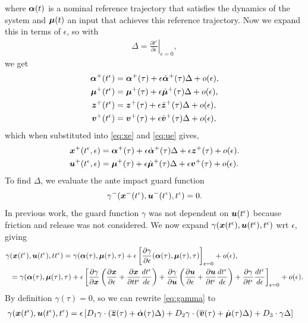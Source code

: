 \documentclass[../DC2017114Bouma.tex]{subfiles}
\begin{document}
where $\boldsymbol{\alpha}(t)$ is a nominal reference trajectory that satisfies the dynamics of the system and $\boldsymbol{\mu}(t)$ an input that achieves this reference trajectory. Now we expand this in terms of $\epsilon$, so with
\begin{align}
\Delta = \left.\frac{\partial t^\epsilon}{\partial\epsilon}\right|_{\epsilon=0},
\end{align} 
we get
\begin{align}
\boldsymbol{\alpha}^{+}(t^\epsilon) &= \boldsymbol{\alpha}^{+}(\tau) + \epsilon \dot{\boldsymbol{\alpha}}^{+}(\tau)\Delta + o(\epsilon),\\
\boldsymbol{\mu}^{+}(t^\epsilon) &= \boldsymbol{\mu}^{+}(\tau) + \epsilon \dot{\boldsymbol{\mu}}^{+}(\tau)\Delta + o(\epsilon),\\
{\boldsymbol{z}}^{+}(t^\epsilon) &= {\boldsymbol{z}}^{+}(\tau) + \epsilon \dot{{\boldsymbol{z}}}^{+}(\tau)\Delta + o(\epsilon),\\
{\boldsymbol{v}}^{+}(t^\epsilon) &= {\boldsymbol{v}}^{+}(\tau) + \epsilon \dot{{\boldsymbol{v}}}^{+}(\tau)\Delta + o(\epsilon),
\end{align}
which when substituted into \eqref{eq:xe} and \eqref{eq:ue} gives,
\begin{align}
{\boldsymbol{x}}^{+}(t^\epsilon,\epsilon) &= \boldsymbol{\alpha}^{+}(\tau) + \epsilon \dot{\boldsymbol{\alpha}}^{+}(\tau)\Delta + \epsilon {\boldsymbol{z}}^{+}(\tau) + o(\epsilon). \label{eq:xeexp}\\
{\boldsymbol{u}}^{+}(t^\epsilon,\epsilon) &= \boldsymbol{\mu}^{+}(\tau) + \epsilon \dot{\boldsymbol{\mu}}^{+}(\tau)\Delta + \epsilon {\boldsymbol{v}}^{+}(\tau) + o(\epsilon). \label{eq:ueexp}
\end{align}
 To find $\Delta$, we evaluate the ante impact guard function
\begin{align}
\gamma^{-}( {\boldsymbol{x}}^{-}(t^\epsilon),{\boldsymbol{u}}^{-}(t^\epsilon),t^\epsilon) = 0.
\end{align}
In previous work, the guard function $\gamma$ was not dependent on ${\boldsymbol{u}}(t^\epsilon)$ because friction and release was not considered. We now expand $\gamma({\boldsymbol{x}}(t^\epsilon),{\boldsymbol{u}}(t^\epsilon),t^\epsilon)$ wrt $\epsilon$, giving
\begin{align}
\gamma&({\boldsymbol{x}}(t^\epsilon),{\boldsymbol{u}}(t^\epsilon),tt^\epsilon) = \gamma( \boldsymbol{\alpha}(\tau), \boldsymbol{\mu}(\tau),\tau) + \epsilon\left[\frac{\partial \gamma}{\partial\epsilon}(\boldsymbol{\alpha}(\tau),\boldsymbol{\mu}(\tau),\tau)\right]_{\epsilon=0} + o(\epsilon),\\
&= \gamma( \boldsymbol{\alpha}(\tau), \boldsymbol{\mu}(\tau),\tau) + \epsilon\left[ \frac{\partial\gamma}{\partial{\boldsymbol{x}}}\left(\frac{\partial{\boldsymbol{x}}}{\partial\epsilon} + \frac{\partial{\boldsymbol{x}}}{\partial tt^\epsilon}\frac{d t^\epsilon}{d\epsilon}\right) + \frac{\partial\gamma}{\partial{\boldsymbol{u}}}\left(\frac{\partial{\boldsymbol{u}}}{\partial\epsilon} + \frac{\partial{\boldsymbol{u}}}{\partial t^\epsilon}\frac{d t^\epsilon}{d\epsilon}\right) + \frac{\partial\gamma}{\partial t^\epsilon}\frac{d t^\epsilon}{d\epsilon}  \right]_{\epsilon=0} + o(\epsilon). \label{eq:gamma}
\end{align}
By definition $\gamma(\tau) = 0$, so we can rewrite \eqref{eq:gamma} to
\begin{align}
\gamma&({\boldsymbol{x}}(t^\epsilon),{\boldsymbol{u}}(t^\epsilon),t^\epsilon) = \epsilon\left[ D_1 \gamma\cdot \left( \overline{{\boldsymbol{z}}}(\tau) + \dot{\boldsymbol{\alpha}}(\tau)\Delta\right) + D_2 \gamma\cdot  \left( \overline{{\boldsymbol{v}}}(\tau) + \dot{\boldsymbol{\mu}}(\tau) \Delta\right) + D_3\cdot  \gamma \Delta \right]\label{eq:gamma2}
\end{align}
\end{document}
